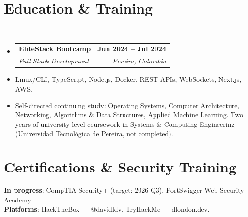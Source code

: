 \documentclass[letterpaper,11pt]{article}
\makeatletter
\newcommand{\resumeItem}[1]{
  \item\small{
    {#1 \vspace{0pt}}
  }
}
\newcommand{\resumeSubheading}[4]{
  \vspace{-2pt}\item
    \begin{tabular*}{1.0\textwidth}[t]{l@{\extracolsep{\fill}}r}
      \textbf{#1} & \textbf{\small #2} \\
      \textit{\small#3} & \textit{\small #4} \\
    \end{tabular*}\vspace{-7pt}
}
\newcommand{\resumeSubHeadingListStart}{\begin{itemize}[leftmargin=0.0in, label={}]}
\newcommand{\resumeSubHeadingListEnd}{\end{itemize}}\vspace{0pt}
\newcommand{\resumeItemListStart}{\begin{itemize}}
\newcommand{\resumeItemListEnd}{\end{itemize}\vspace{-5pt}}
\makeatother
\begin{document}
\section{Education \& Training} \\[1mm]
\vspace{-2pt}
    \resumeSubHeadingListStart
    \resumeSubheading
      {EliteStack Bootcamp}{Jun 2024 -- Jul 2024}
      {Full-Stack Development}{Pereira, Colombia}
  \resumeSubHeadingListEnd
    \resumeItemListStart
        \resumeItem {Linux/CLI, TypeScript, Node.js, Docker, REST APIs, WebSockets, Next.js, AWS.}
        \resumeItem {Self-directed continuing study: Operating Systems, Computer Architecture, Networking, Algorithms \& Data Structures, Applied Machine Learning. Two years of university-level coursework in Systems \& Computing Engineering (Universidad Tecnológica de Pereira, not completed).}
    \resumeItemListEnd
\vspace{-12pt}
\section{Certifications \& Security Training}
\vspace{-2pt}
 \begin{itemize}[leftmargin=0.15in, label={}]
    \small{\item{
     \textbf{In progress}{: CompTIA Security+ (target: 2026-Q3), PortSwigger Web Security Academy.} \\[1mm]
     \textbf{Platforms}{: HackTheBox — @davidldv, TryHackMe — dlondon.dev.} \\[1mm]
    }}
 \end{itemize}
 \vspace{-14pt}

\end{document}
